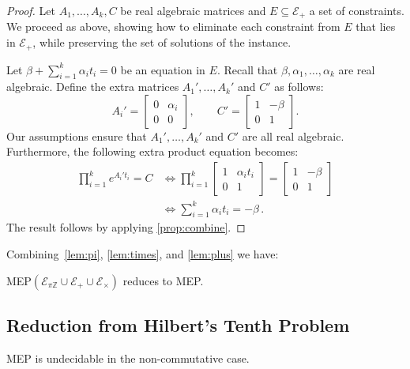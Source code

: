 \documentclass[format=acmsmall, review=false, screen=true]{acmart}
\newcommand{\Integers}{\mathbb{Z}}
\begin{document}
\begin{proof}
  Let $A_1,\ldots,A_k,C$ be real algebraic matrices and
  $E \subseteq\mathcal{E}_{+}$ a set of constraints.
  We proceed as above, showing how to eliminate each constraint from
  $E$ that lies in $\mathcal{E}_{+}$, while preserving the set of
  solutions of the instance.

Let $\beta+\sum_{i=1}^{k} \alpha_{i} t_{i}=0$ be an equation in $E$.
Recall that $\beta,\alpha_1,\ldots,\alpha_k$ are real algebraic.
Define the extra matrices $A_1',\ldots,A_k'$ and $C'$ as follows:
\[A_i'=
\begin{bmatrix}
  0&\alpha_{i} \\
  0&0
\end{bmatrix},
\qquad C'=\begin{bmatrix}
1&-\beta \\
0&1\end{bmatrix}.
\]
Our assumptions ensure that $A_1',\ldots,A_k'$ and $C'$ are all real algebraic.
Furthermore, the following extra product equation becomes:
\begin{align*}
\prod_{i=1}^{k} e^{A_i't_{i}}=C &\Leftrightarrow
\prod_{i=1}^{k}\begin{bmatrix}
1&\alpha_{i} t_{i} \\
0&1
\end{bmatrix}=\begin{bmatrix}
1&-\beta \\
0&1
\end{bmatrix}\\
&\Leftrightarrow\sum_{i=1}^{k}\alpha_{i} t_{i}=-\beta \, .
\end{align*}
The result follows by applying \cref{prop:combine}.
\end{proof}

Combining~\cref{lem:pi}, \cref{lem:times}, and \cref{lem:plus} we
have:
\begin{proposition}
  MEP$(\mathcal{E}_{\pi\Integers}\cup\mathcal{E}_{+}\cup\mathcal{E}_{\times})$
  reduces to MEP\@.
\end{proposition}

\subsection{Reduction from Hilbert's Tenth Problem}

\begin{theorem}
  MEP is undecidable in the non-commutative case.
\end{theorem}
\end{document}
